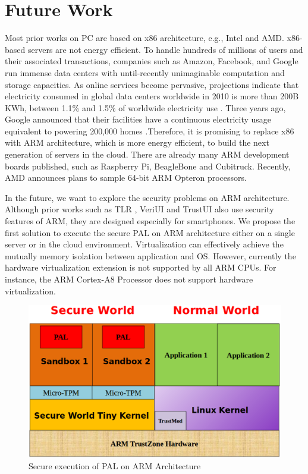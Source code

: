 \section{Future Work}
\label{sec:future}

Most prior works on PC are based on x86 architecture, e.g., Intel and AMD.
x86-based servers are not energy efficient. To handle hundreds of millions of
users and their associated transactions, companies such as Amazon, Facebook,
and Google run immense data centers with until-recently unimaginable
computation and storage capacities. As online services become pervasive,
projections indicate that electricity consumed in global data centers worldwide
in 2010 is more than 200B KWh, between 1.1\% and 1.5\% of worldwide electricity
use \cite{times}. Three years ago, Google announced that their facilities have
a continuous electricity usage equivalent to powering 200,000 homes
\cite{nytimes-google}.Therefore, it is promising to replace x86 with ARM
architecture, which is more energy efficient, to build the next generation of
servers in the cloud. There are already many ARM development boards published,
such as Raspberry Pi, BeagleBone and Cubitruck. Recently, AMD announces plans
to sample 64-bit ARM Opteron processors. 

In the future, we want to explore the security problems on ARM architecture.
Although prior works such as TLR \cite{TLR}, VeriUI \cite{VeriUI} and TrustUI
\cite{TrustUI} also use security features of ARM, they are designed especially
for smartphones. We propose the first solution to execute the secure PAL on ARM
architecture either on a single server or in the cloud environment.
Virtualization can effectively achieve the mutually memory isolation between
application and OS. However, currently the hardware virtualization extension is
not supported by all ARM CPUs. For instance, the ARM Cortex-A8 Processor does
not support hardware virtualization.

\begin{figure}[htb]
\centering
\includegraphics[width=\columnwidth]{figures/future.eps}
\caption{Secure execution of PAL on ARM Architecture}
\label{fig:future}
\end{figure}

